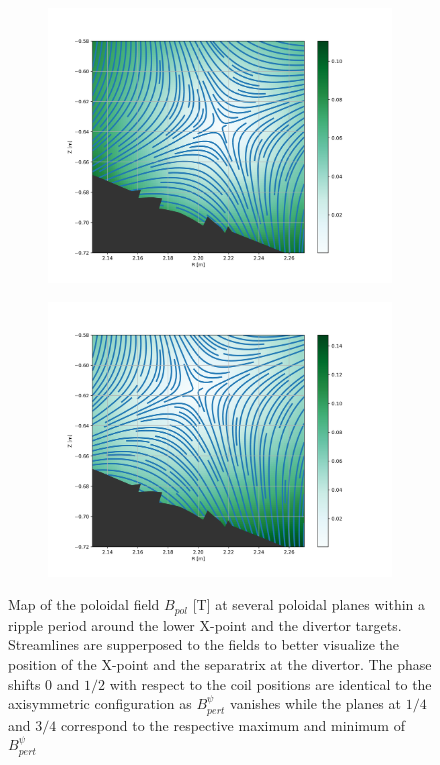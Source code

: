 \begin{figure}[H]
\begin{subfigure}[t]{0.43\textwidth}
		\centering
		\includegraphics[width=1\textwidth]{schemes/rippleStreamlines_phi3.png}
		\label{fig:ripple_Xpoint_phi3}
	\end{subfigure}
	\begin{subfigure}[t]{0.43\textwidth}
		\centering
		\includegraphics[width=1\textwidth]{schemes/rippleStreamlines_phi4.png}
		\label{fig:ripple_Xpoint_phi4}
	\end{subfigure}
	\caption[Map of the poloidal field $B_{pol}$ at several poloidal planes within a ripple period around the lower X-point and the divertor targets]{Map of the poloidal field $B_{pol}$ [T] at several poloidal planes within a ripple period around the lower X-point and the divertor targets. Streamlines are supperposed to the fields to better visualize the position of the X-point and the separatrix at the divertor. The phase shifts $0$ and $1/2$ with respect to the coil positions are identical to the axisymmetric configuration as $B_{pert}^{\psi}$ vanishes while the planes at $1/4$ and $3/4$ correspond to the respective maximum and minimum of $B_{pert}^{\psi}$}
	\label{fig:ripple_Xpoint}
\end{figure}

